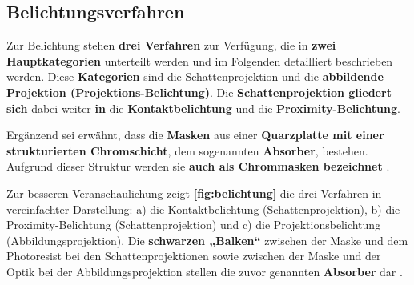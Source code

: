 \documentclass{article} %
\begin{document}
%





\vspace{1em}

\subsection{Belichtungsverfahren}

Zur Belichtung stehen \textbf{drei Verfahren} zur Verfügung, die in \textbf{zwei Hauptkategorien} unterteilt werden und im Folgenden detailliert beschrieben werden. Diese \textbf{Kategorien} sind die Schattenprojektion und die \textbf{abbildende Projektion (Projektions-Belichtung)}. Die \textbf{Schattenprojektion gliedert sich} dabei weiter \textbf{in} die \textbf{Kontaktbelichtung} und die \textbf{Proximity-Belichtung}.

\vspace{1em}

Ergänzend sei erwähnt, dass die \textbf{Masken} aus einer \textbf{Quarzplatte mit einer strukturierten Chromschicht}, dem sogenannten \textbf{Absorber}, bestehen. Aufgrund dieser Struktur werden sie \textbf{auch als Chrommasken bezeichnet} \cite{schmid2024, Mescheder2004}.

\vspace{1em}

Zur besseren Veranschaulichung zeigt \textbf{\autoref{fig:belichtung}} die drei Verfahren in vereinfachter Darstellung: a) die Kontaktbelichtung (Schattenprojektion), b) die Proximity-Belichtung (Schattenprojektion) und c) die Projektionsbelichtung (Abbildungsprojektion). Die \textbf{schwarzen „Balken“} zwischen der Maske und dem Photoresist bei den Schattenprojektionen sowie zwischen der Maske und der Optik bei der Abbildungsprojektion stellen die zuvor genannten \textbf{Absorber} dar \cite{schmid2024}.
\end{document}
